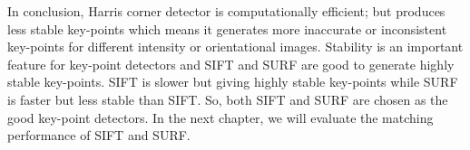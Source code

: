 \noindent In conclusion, Harris corner detector is computationally efficient; but produces less stable key-points which means it generates more inaccurate or inconsistent key-points for different intensity or orientational images. Stability is an important feature for key-point detectors and SIFT and SURF are good to generate highly stable key-points. SIFT is slower but giving highly stable key-points while SURF is faster but less stable than SIFT. So, both SIFT and SURF are chosen as the good key-point detectors. In the next chapter, we will evaluate the matching performance of SIFT and SURF.



